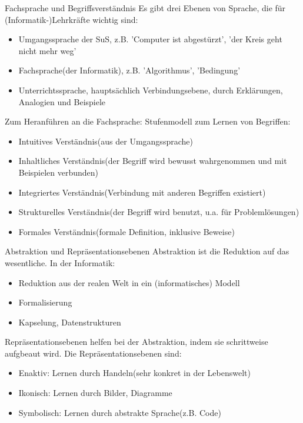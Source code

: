 \documentclass{article}
\begin{document}
\begin{block}{Fachsprache und Begriffsverständnis}
    Es gibt drei Ebenen von Sprache, die für (Informatik-)Lehrkräfte wichtig sind:
    \begin{itemize}
        \item Umgangssprache der SuS, z.B. 'Computer ist abgestürzt', 'der Kreis geht nicht mehr weg'
        \item Fachsprache(der Informatik), z.B. 'Algorithmus', 'Bedingung'
        \item Unterrichtssprache, hauptsächlich Verbindungsebene, durch Erklärungen, Analogien und Beispiele
    \end{itemize}
    Zum Heranführen an die Fachsprache:
    Stufenmodell zum Lernen von Begriffen:
    \begin{itemize}
        \item Intuitives Verständnis(aus der Umgangssprache)
        \item Inhaltliches Verständnis(der Begriff wird bewusst wahrgenommen und mit Beispielen verbunden)
        \item Integriertes Verständnis(Verbindung mit anderen Begriffen existiert)
        \item Strukturelles Verständnis(der Begriff wird benutzt, u.a. für Problemlösungen)
        \item Formales Verständnis(formale Definition, inklusive Beweise)
    \end{itemize}
\end{block}

\begin{block}{Abstraktion und Repräsentationsebenen}
    Abstraktion ist die Reduktion auf das wesentliche.
    In der Informatik:
    \begin{itemize}
        \item Reduktion aus der realen Welt in ein (informatisches) Modell
        \item Formalisierung
        \item Kapselung, Datenstrukturen
    \end{itemize}
    Repräsentationsebenen helfen bei der Abstraktion, indem sie schrittweise aufgbeaut wird.
    Die Repräsentationsebenen sind:
    \begin{itemize}
        \item Enaktiv: Lernen durch Handeln(sehr konkret in der Lebenswelt)
        \item Ikonisch: Lernen durch Bilder, Diagramme
        \item Symbolisch: Lernen durch abstrakte Sprache(z.B. Code)
    \end{itemize}
\end{block}
\end{document}
